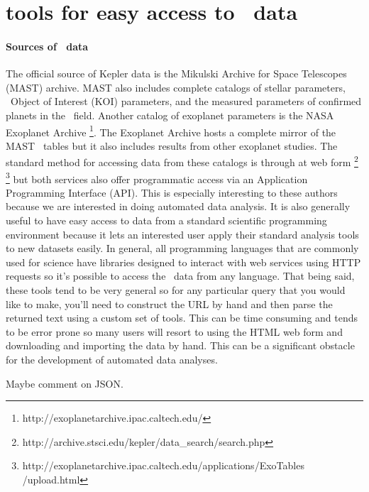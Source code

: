 \documentclass[letterpaper,12pt,preprint]{hack_aastex}
\begin{document}
\section{tools for easy access to \Kepler\ data}

\paragraph{Sources of \Kepler\ data}
The official source of Kepler data is the Mikulski Archive for Space
Telescopes (MAST) archive.
MAST also includes complete catalogs of stellar parameters, \Kepler\ Object of
Interest (KOI) parameters, and the measured parameters of confirmed planets
in the \Kepler\ field.
Another catalog of exoplanet parameters is the NASA Exoplanet Archive%
\footnote{http://exoplanetarchive.ipac.caltech.edu/}.
The Exoplanet Archive hosts a complete mirror of the MAST \Kepler\ tables but
it also includes results from other exoplanet studies.
The standard method for accessing data from these catalogs is through at web
form%
\footnote{http://archive.stsci.edu/kepler/data\_search/search.php}%
\footnote{http://exoplanetarchive.ipac.caltech.edu/applications/ExoTables%
/upload.html}
but both services also offer programmatic access via an Application
Programming Interface (API).
This is especially interesting to these authors because we are interested in
doing automated data analysis.
It is also generally useful to have easy access to data from a standard
scientific programming environment because it lets an interested user apply
their standard analysis tools to new datasets easily.
In general, all programming languages that are commonly used for science have
libraries designed to interact with web services using HTTP requests so it's
possible to access the \Kepler\ data from any language.
That being said, these tools tend to be very general so for any particular
query that you would like to make, you'll need to construct the URL by hand
and then parse the returned text using a custom set of tools.
This can be time consuming and tends to be error prone so many users will
resort to using the HTML web form and downloading and importing the data by
hand.
This can be a significant obstacle for the development of automated data
analyses.

Maybe comment on JSON.\
\end{document}
